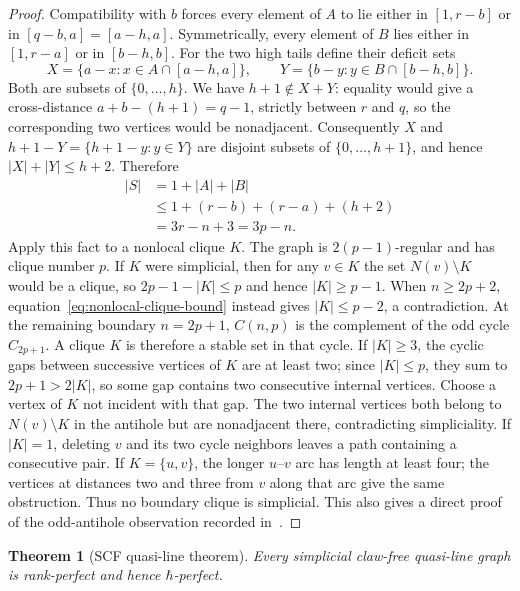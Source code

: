 \documentclass[11pt,a4paper]{article}
\newtheorem{theorem}{Theorem}[section]
\theoremstyle{remark}
\begin{document}
\begin{proof}
Compatibility with $b$ forces every element of $A$ to lie either in
$[1,r-b]$ or in $[q-b,a]=[a-h,a]$. Symmetrically, every element of $B$ lies
either in $[1,r-a]$ or in $[b-h,b]$. For the two high tails define their
deficit sets
\[
 X=\{a-x:x\in A\cap[a-h,a]\},\qquad
 Y=\{b-y:y\in B\cap[b-h,b]\}.
\]
Both are subsets of $\{0,\ldots,h\}$. We have $h+1\notin X+Y$: equality
would give a cross-distance
$a+b-(h+1)=q-1$, strictly between $r$ and $q$, so the corresponding two
vertices would be nonadjacent. Consequently $X$ and
$h+1-Y=\{h+1-y:y\in Y\}$ are disjoint subsets of
$\{0,\ldots,h+1\}$, and hence $|X|+|Y|\leq h+2$. Therefore
\begin{equation}\label{eq:nonlocal-clique-bound}
\begin{split}
 |S|&=1+|A|+|B|\\
 &\leq1+(r-b)+(r-a)+(h+2)\\
 &=3r-n+3=3p-n.
\end{split}
\end{equation}
Apply this fact to a nonlocal clique $K$.
The graph is $2(p-1)$-regular and has clique number $p$. If $K$ were
simplicial, then for any $v\in K$ the set $N(v)\setminus K$ would be a
clique, so $2p-1-|K|\leq p$ and hence $|K|\geq p-1$. When
$n\geq2p+2$, equation~\eqref{eq:nonlocal-clique-bound} instead gives
$|K|\leq p-2$, a contradiction. At the remaining boundary $n=2p+1$,
$C(n,p)$ is the complement of the odd cycle $C_{2p+1}$. A clique $K$ is
therefore a stable set in that cycle. If $|K|\geq3$, the cyclic gaps between
successive vertices of $K$ are at least two; since $|K|\leq p$, they sum to
$2p+1>2|K|$, so some
gap contains two consecutive internal vertices. Choose a vertex of $K$ not
incident with that gap. The two internal vertices both belong to
$N(v)\setminus K$ in the antihole but are nonadjacent there, contradicting
simpliciality. If $|K|=1$, deleting $v$ and its two cycle neighbors leaves a
path containing a consecutive pair. If $K=\{u,v\}$, the longer $u$--$v$ arc
has length at least four; the vertices at distances two and three from $v$
along that arc give the same obstruction. Thus no boundary clique is
simplicial. This also gives
a direct proof of the odd-antihole observation recorded in~\cite{csss}.
\end{proof}

\begin{theorem}[SCF quasi-line theorem]\label{thm:scf-quasiline}
Every simplicial claw-free quasi-line graph is rank-perfect and hence
$\hbar$-perfect.
\end{theorem}
\end{document}
